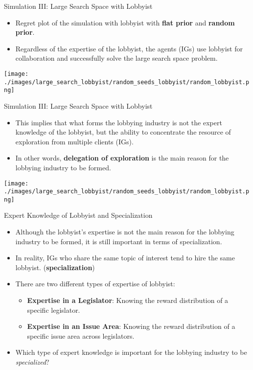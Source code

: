 \documentclass{beamer}
\begin{document}
	\begin{frame}{Simulation III: Large Search Space with Lobbyist}
		\begin{itemize}
			\item Regret plot of the simulation with lobbyist with \textbf{flat prior} and \textbf{random prior}.
			\item Regardless of the expertise of the lobbyist, the agents (IGs) use lobbyist for collaboration and successfully solve the large search space problem.
		\end{itemize}
		\centering	\texttt{[image: ./images/large\_search\_lobbyist/random\_seeds\_lobbyist/random\_lobbyist.png]}
	\end{frame}

	\begin{frame}{Simulation III: Large Search Space with Lobbyist}
		\begin{itemize}
			\item This implies that what forms the lobbying industry is not the expert knowledge of the lobbyist, but the ability to concentrate the resource of exploration from multiple clients (IGs).
			\item In other words, \textbf{delegation of exploration} is the main reason for the lobbying industry to be formed.
		\end{itemize}
		\centering	\texttt{[image: ./images/large\_search\_lobbyist/random\_seeds\_lobbyist/random\_lobbyist.png]}
	\end{frame}

	\begin{frame}{Expert Knowledge of Lobbyist and Specialization}
		\begin{itemize}
			\item Although the lobbyist's expertise is not the main reason for the lobbying industry to be formed, it is still important in terms of specialization.
			\item In reality, IGs who share the same topic of interest tend to hire the same lobbyist. (\textbf{specialization})
			\item There are two different types of expertise of lobbyist:
			\begin{itemize}
				\item \textbf{Expertise in a Legislator}: Knowing the reward distribution of a specific legislator.
				\item \textbf{Expertise in an Issue Area}: Knowing the reward distribution of a specific issue area across legislators.
			\end{itemize}
			\item Which type of expert knowledge is important for the lobbying industry to be \textit{specialized}?
		\end{itemize}
	\end{frame}
\end{document}

